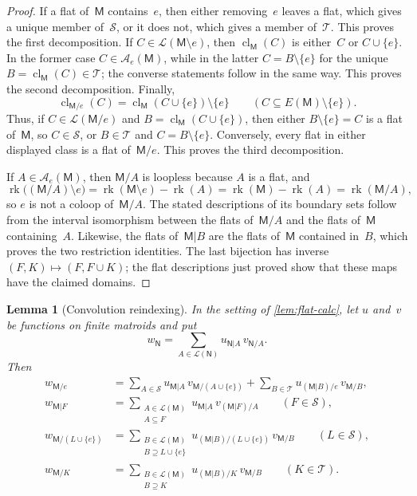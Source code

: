 \documentclass[12pt,letterpaper,english]{amsart}
\theoremstyle{teoremas}
\newtheorem{lemma}[theorem]{Lemma}
\theoremstyle{definition}
\DeclareMathOperator{\rk}{rk}
\DeclareMathOperator{\cl}{cl}
\newcommand{\M}{\mathsf{M}}
\newcommand{\N}{\mathsf{N}}
\newcommand{\Ae}{\mathcal{A}_e}
\begin{document}
\begin{proof}
If a flat of~$\M$ contains~$e$, then either removing~$e$ leaves a flat,
which gives a unique member of~$\mathcal{S}$, or it does not, which gives
a member of~$\mathcal{T}$.  This proves the first decomposition.
If $C \in \mathcal{L}(\M \setminus e)$, then $\cl_{\M}(C)$ is either~$C$
or $C \cup \{e\}$.  In the former case $C \in \Ae(\M)$, while in the
latter $C = B \setminus \{e\}$ for the unique $B = \cl_{\M}(C) \in \mathcal{T}$;
the converse statements follow in the same way.  This proves the second
decomposition.  Finally,
\[
\cl_{\M/e}(C) = \cl_{\M}(C \cup \{e\}) \setminus \{e\}
\qquad (C \subseteq E(\M) \setminus \{e\}).
\]
Thus, if $C \in \mathcal{L}(\M/e)$ and $B = \cl_{\M}(C \cup \{e\})$,
then either $B \setminus \{e\} = C$ is a flat of~$\M$, so $C \in \mathcal{S}$,
or $B \in \mathcal{T}$ and $C = B \setminus \{e\}$.  Conversely, every flat
in either displayed class is a flat of~$\M/e$.
This proves the third decomposition.

If $A \in \Ae(\M)$, then $\M/A$ is loopless because $A$ is a flat, and
\[
\rk\bigl((\M/A) \setminus e\bigr) = \rk(\M \setminus e) - \rk(A)
= \rk(\M) - \rk(A) = \rk(\M/A),
\]
so $e$ is not a coloop of~$\M/A$.  The stated descriptions of its
boundary sets follow from the interval isomorphism between the flats
of~$\M/A$ and the flats of~$\M$ containing~$A$.  Likewise, the flats
of~$\M|B$ are the flats of~$\M$ contained in~$B$, which proves the two
restriction identities.  The last bijection has inverse
$(F,K) \mapsto (F, F \cup K)$; the flat descriptions just proved show
that these maps have the claimed domains.
\end{proof}

\begin{lemma}[Convolution reindexing]\label{lem:conv-reindex}
In the setting of \cref{lem:flat-calc}, let $u$ and~$v$ be functions on
finite matroids and put
\[
w_{\N} = \sum_{A \in \mathcal{L}(\N)} u_{\N|A}\, v_{\N/A}.
\]
Then
\begin{align}
w_{\M/e}
  &= \sum_{A \in \mathcal{S}} u_{\M|A}\, v_{\M/(A \cup \{e\})}
   + \sum_{B \in \mathcal{T}} u_{(\M|B)/e}\, v_{\M/B},
     \label{eq:reindex-1} \\
w_{\M|F}
  &= \sum_{\substack{A \in \mathcal{L}(\M) \\ A \subseteq F}}
     u_{\M|A}\, v_{(\M|F)/A}
     \qquad (F \in \mathcal{S}),
     \label{eq:reindex-2} \\
w_{\M/(L \cup \{e\})}
  &= \sum_{\substack{B \in \mathcal{L}(\M) \\ B \supseteq L \cup \{e\}}}
     u_{(\M|B)/(L \cup \{e\})}\, v_{\M/B}
     \qquad (L \in \mathcal{S}),
     \label{eq:reindex-3} \\
w_{\M/K}
  &= \sum_{\substack{B \in \mathcal{L}(\M) \\ B \supseteq K}}
     u_{(\M|B)/K}\, v_{\M/B}
     \qquad (K \in \mathcal{T}).
     \label{eq:reindex-4}
\end{align}
\end{lemma}
\end{document}
